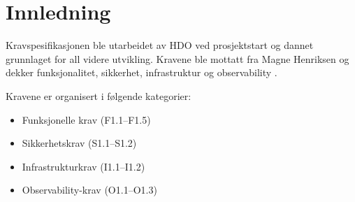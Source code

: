 \section{Innledning}
\label{sec:krav-innledning}

Kravspesifikasjonen ble utarbeidet av HDO ved prosjektstart og 
dannet grunnlaget for all videre utvikling. Kravene ble mottatt 
fra Magne Henriksen og dekker funksjonalitet, sikkerhet, 
infrastruktur og observability \cite{hdo_kravspec}.

Kravene er organisert i følgende kategorier:

\begin{itemize}
    \item Funksjonelle krav (F1.1--F1.5)
    \item Sikkerhetskrav (S1.1--S1.2)
    \item Infrastrukturkrav (I1.1--I1.2)
    \item Observability-krav (O1.1--O1.3)
\end{itemize}